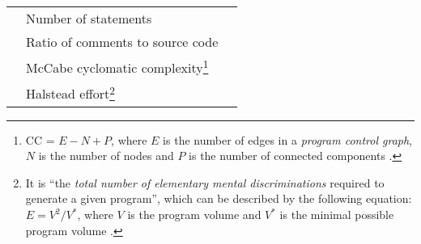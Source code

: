 \begin{longtable}{c X c}
& Number of statements & \cite{systematic, method-level, micro_interaction, how_and_why} \\
& Ratio of comments to source code & \cite{method-level, how_and_why} \\
& McCabe cyclomatic complexity\footnote{CC = $ E - N + P $, where $E$ is the number of edges in a \emph{program control graph}, $N$ is the number of nodes and $P$ is the number of connected components \cite{McCabe}.} & \cite{systematic, method-level, how_and_why} \\
& Halstead effort\footnote{It is ``the \emph{total number of elementary mental discriminations} required to generate a given program'', which can be described by the following equation: $E = V^2/V^*$, where $V$ is the program volume and $V^*$ is the minimal possible program volume \cite[p. 47]{Halstead}.} & \cite{systematic} \\
\bottomrule
\end{longtable}